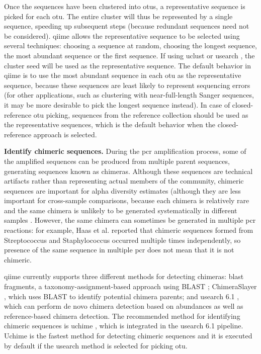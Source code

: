 Once the sequences have been clustered into \gls{otu}s, a representative sequence
is picked for each \gls{otu}. The entire cluster will thus be represented by a single
sequence, speeding up subsequent steps (because redundant sequences need not be
considered). \gls{qiime} allows the representative sequence to be selected using
several techniques: choosing a sequence at random, choosing the longest sequence,
the most abundant sequence or the first sequence. If using uclust or usearch \cite{Edgar2010},
the cluster seed will be used as the representative sequence. The default behavior
in \gls{qiime} is to use the most abundant sequence in each \gls{otu} as the
representative sequence, because these sequences are least likely to represent
sequencing errors (for other applications, such as clustering with near-full-length
Sanger sequences, it may be more desirable to pick the longest sequence instead).
In case of closed-reference \gls{otu} picking, sequences from the reference collection
should be used as the representative sequences, which is the default behavior when
the closed-reference approach is selected.

\textbf{Identify chimeric sequences.} During the \gls{pcr} amplification process,
some of the amplified sequences can be produced from multiple parent sequences,
generating sequences known as chimeras. Although these sequences are technical
artifacts rather than representing actual members of the community, chimeric sequences
are important for alpha diversity estimates (although they are less important for
cross-sample comparisons, because each chimera is relatively rare and the same
chimera is unlikely to be generated systematically in different samples \cite{Ley2008}.
However, the same chimera can sometimes be generated in multiple \gls{pcr} reactions:
for example, Haas et al. \cite{Haas2011} reported that chimeric sequences formed
from Streptococcus and Staphylococcus occurred multiple times independently, so
presence of the same sequence in multiple \gls{pcr} does not mean that it is not chimeric.

\gls{qiime} currently supports three different methods for detecting chimeras: blast
fragments, a taxonomy-assignment-based approach using BLAST \cite{Altschul1990};
ChimeraSlayer \cite{Haas2011}, which uses BLAST to identify potential chimera parents;
and usearch 6.1 \cite{Edgar2010}, which can perform de novo chimera detection based on
abundances as well as reference-based chimera detection. The recommended method for
identifying chimeric sequences is uchime \cite{Edgar2011}, which is integrated in
the usearch 6.1 \cite{Edgar2010} pipeline. Uchime is the fastest method for detecting
chimeric sequences and it is executed by default if the usearch method is selected
for picking \gls{otu}.

